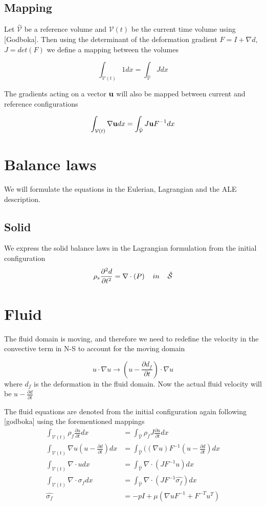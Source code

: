 \subsection*{Mapping}
Let $\hat{\mathcal{V}}$ be a reference volume and $\mathcal{V}(t)$ be the current time volume using [Godboka]. Then using the determinant of the deformation gradient $F = I+\nabla d $,  $J = det(F)$ we define a mapping between the volumes

$$  \int_{\mathcal{V}(t)} 1  dx = \int_{\hat{\mathcal{V}}} J dx  $$

The gradients acting on a vector $ \bold{u} $ will also be mapped between current and reference configurations

$$  \int_{\mathcal{V}(t)} \nabla \bold{u}   dx = \int_{\hat{\mathcal{V}}} J  \bold{u}F^{-1} dx  $$

\section*{Balance laws}
We will formulate the equations in the Eulerian, Lagrangian and the ALE description.

\subsection*{Solid}
We express the solid balance laws in the Lagrangian formulation from the initial configuration
$$\rho_s \frac{\partial^2 d}{\partial t^2} = \nabla \cdot (P) \hspace{4mm}in\hspace{4mm} \hat{\mathcal{S}} $$

\section*{Fluid}
The fluid domain is moving, and therefore we need to redefine the velocity in the convective term in N-S to account for the moving domain 

$$u \cdot \nabla u \rightarrow (u-\frac{\partial d_f}{\partial t}) \cdot \nabla u  $$ 
where $d_f$ is the deformation in the fluid domain. Now the actual fluid velocity will be $u-\frac{\partial d}{\partial t}$ 

The fluid equations are denoted from the initial configuration again following [godboka] using the forementioned mappings
\begin{align}
\int_{\mathcal{V}(t)} \rho_f \frac{\partial u}{\partial t} dx & = \int_{\hat{\mathcal{V}}}  \rho_f J \frac{\partial u}{\partial t} dx \\
\int_{\mathcal{V}(t)} \nabla u (u-\frac{\partial d}{\partial t}) dx  &= \int_{\hat{\mathcal{V}}} ((\nabla u)F^{-1}(u-\frac{\partial d}{\partial t}) dx  \\
\int_{\mathcal{V}(t)} \nabla \cdot u dx  &=\int_{\hat{\mathcal{V}}}  \nabla \cdot (J F^{-1} u  ) dx \\
\int_{\mathcal{V}(t)} \nabla \cdot \sigma_f dx &= \int_{\hat{\mathcal{V}}} \nabla \cdot( J F^{-1} \hat{\sigma_f} )     dx \\
\hat{\sigma_f} &= -pI + \mu ( \nabla u F^{-1} + F^{-T} u^{T}  ) 
\end{align}
 

